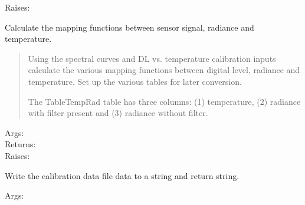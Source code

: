 \documentclass[a4paper,10pt,english]{sphinxmanual}
\begin{document}
\begin{fulllineitems}
\begin{description}
\item[{Raises:}] \leavevmode
{}

\end{description}

\begin{fulllineitems}
\label{rylookup:pyradi.rylookup.RadLookup.CalculateDataTables}
Calculate the mapping functions between sensor signal, radiance and temperature.
\begin{quote}

Using the spectral curves and DL vs. temperature calibration inputs
calculate the various mapping functions between digital level, radiance
and temperature. Set up the various tables for later conversion.

The TableTempRad table has three columns: (1) temperature, (2) radiance
with filter present and (3) radiance without filter.
\end{quote}
\begin{description}
\item[{Args:}] \leavevmode
{}

\item[{Returns:}] \leavevmode
{}

\item[{Raises:}] \leavevmode
{}

\end{description}

\end{fulllineitems}


\begin{fulllineitems}
\label{rylookup:pyradi.rylookup.RadLookup.Info}
Write the calibration data file data to a string and return string.
\begin{description}
\item[{Args:}] \leavevmode
{}


\end{description}
\end{fulllineitems}
\end{fulllineitems}
\end{document}
